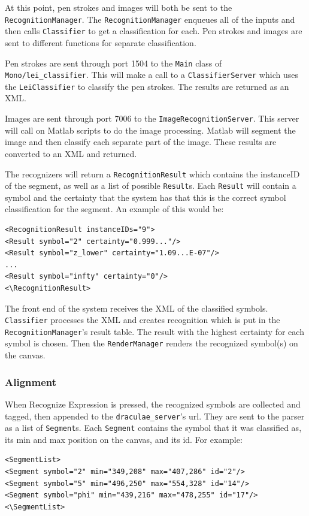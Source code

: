 \documentclass[letterpaper]{article}
\begin{document}
At this point, pen strokes and images will both be sent to the \verb+RecognitionManager+.
The \verb+RecognitionManager+ enqueues all of the inputs and then calls \verb+Classifier+
to get a classification for each. Pen strokes and images are sent to different functions
for separate classification.

Pen strokes are sent through port 1504 to the \verb+Main+ class of \verb+Mono/lei_classifier+.
This will make a call to a \verb+ClassifierServer+ which uses the \verb+LeiClassifier+ to
classify the pen strokes. The results are returned as an XML.

Images are sent through port 7006 to the \verb+ImageRecognitionServer+. This server will
call on Matlab scripts to do the image processing. Matlab will segment the image and then
classify each separate part of the image. These results are converted to an XML and returned.

The recognizers will return a \verb+RecognitionResult+ which contains the instanceID of the
segment, as well as a list of possible \verb+Result+s. Each \verb+Result+ will contain a
symbol and the certainty that the system has that this is the correct symbol classification
for the segment. An example of this would be:
\begin{verbatim}<RecognitionResult instanceIDs="9">
<Result symbol="2" certainty="0.999..."/>
<Result symbol="z_lower" certainty="1.09...E-07"/>
...
<Result symbol="infty" certainty="0"/>
<\RecognitionResult>\end{verbatim}

The front end of the system receives the XML of the classified symbols. \verb+Classifier+
processes the XML and creates recognition which is put in the \verb+RecognitionManager+'s
result table. The result with the highest certainty for each symbol is chosen. Then the
\verb+RenderManager+ renders the recognized symbol(s) on the canvas.

\subsubsection*{Alignment}
When Recognize Expression is pressed, the recognized symbols are collected and tagged,
then appended to the \verb+draculae_server+'s url. They are sent to the parser as a list
of \verb+Segment+s. Each \verb+Segment+ contains the symbol that it was classified as,
its min and max position on the canvas, and its id. For example:
\begin{verbatim}<SegmentList>
<Segment symbol="2" min="349,208" max="407,286" id="2"/>
<Segment symbol="5" min="496,250" max="554,328" id="14"/>
<Segment symbol="phi" min="439,216" max="478,255" id="17"/>
<\SegmentList>\end{verbatim}
\end{document}
